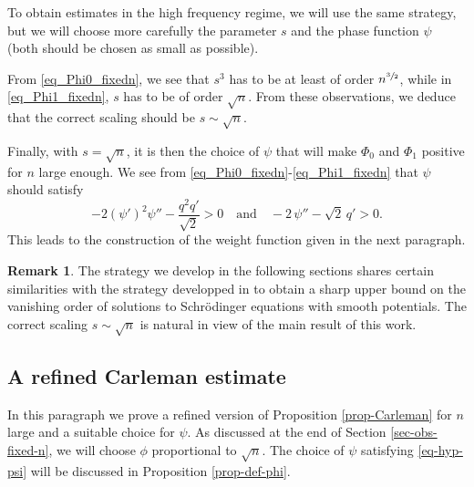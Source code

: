 \documentclass[JEP,XML,SOM,Unicode]{cedram}
\theoremstyle{plain}
\theoremstyle{definition}
\newtheorem{remark}[theorem]{Remark}
\newcommand{\1}{\mathds 1}
\let\vf\phi
\begin{document}
To obtain estimates in the high frequency regime, we will use the same strategy, but we will choose more carefully the parameter $s$ and the phase function $\psi$ (both should be chosen as small as possible).

From \eqref{eq_Phi0_fixedn}, we see that $s^3$ has to be at least of order $n^{\sfrac{3}{2}}$, while in \eqref{eq_Phi1_fixedn}, $s$
has to be of order $\sqrt n$. From these observations, we deduce that the correct scaling should be $s \sim \sqrt n$.

Finally, with $s = \sqrt n$, it is then the choice of $\psi$ that will make $\Phi_0$ and $\Phi_1$ positive for $n$ large enough.
We see from \eqref{eq_Phi0_fixedn}-\eqref{eq_Phi1_fixedn} that $\psi$ should satisfy
\begin{equation} \label{eq-hyp-psi}
-2 (\psi')^2 \psi'' - \frac{q^2q'}{\sqrt{2}} > 0 \quad \text{and} \quad - 2\,\psi'' - \sqrt{2}\, q' >0.
\end{equation}
This leads to the construction of the weight function given in the next paragraph.

\begin{remark}
The strategy we develop in the following sections shares certain similarities with the strategy developped in \cite{Bakri12} to obtain a sharp upper bound on the vanishing order of solutions to Schrödinger equations with smooth potentials. The correct scaling $s \sim \sqrt n$ is natural in view of the main result of this work.
\end{remark}

\subsection{A refined Carleman estimate}

In this paragraph we prove a refined version of Proposition \ref{prop-Carleman} for $n$ large and a suitable choice for $\psi$. As discussed at the end of Section \ref{sec-obs-fixed-n}, we will choose $\vf$ proportional to $\sqrt n$. The choice of $\psi$ satisfying \eqref{eq-hyp-psi} will be discussed in Proposition \ref{prop-def-phi}.
\end{document}
